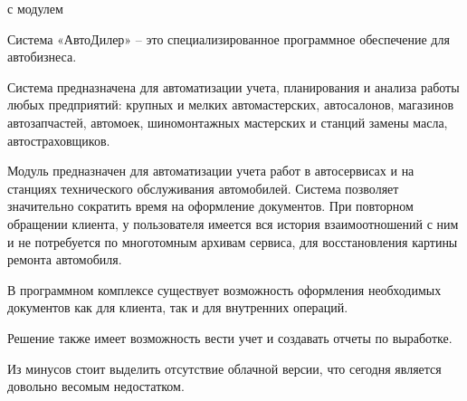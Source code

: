  с модулем 

Система «АвтоДилер» -- это специализированное программное обеспечение для
автобизнеса.

Система предназначена для автоматизации учета, планирования и анализа работы
любых предприятий: крупных и мелких автомастерских, автосалонов, магазинов
автозапчастей, автомоек, шиномонтажных мастерских и станций замены масла,
автостраховщиков.

Модуль  предназначен для автоматизации учета работ в автосервисах и на
станциях технического обслуживания автомобилей. Система позволяет значительно
сократить время на оформление документов. При повторном обращении клиента, у
пользователя имеется вся история взаимоотношений с ним и не потребуется
 по многотомным архивам сервиса, для восстановления картины
ремонта автомобиля.

В программном комплексе существует возможность оформления необходимых документов
как для клиента, так и для внутренних операций.

Решение также имеет возможность вести учет и создавать отчеты по выработке.

Из минусов стоит выделить отсутствие облачной версии, что сегодня является
довольно весомым недостатком.
